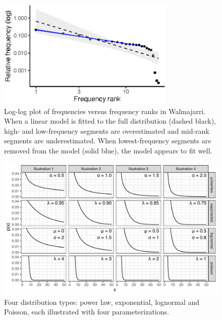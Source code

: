 \begin{figure}

{\centering \includegraphics[width=85mm]{fig/Fig2_walmajarri_lm} 

}

\caption{Log-log plot of frequencies versus frequency ranks in Walmajarri. When a linear model is fitted to the full distribution (dashed black), high- and low-frequency segments are overestimated and mid-rank segments are underestimated. When lowest-frequency segments are removed from the model (solid blue), the model appears to fit well.}\label{fig:Figure-2}
\end{figure}

\begin{figure}

{\centering \includegraphics[width=180mm]{fig/Fig3_distribution_illustrations} 

}

\caption{Four distribution types: power law, exponential, lognormal and Poisson, each illustrated with four parameterizations.}\label{fig:Figure-3}
\end{figure}
